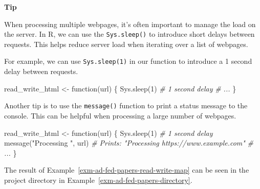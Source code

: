 \documentclass[
  letterpaper,
  DIV=11,
  numbers=noendperiod]{scrreport}
\newenvironment{Shaded}{\begin{snugshade}}{\end{snugshade}}
\newcommand{\CommentTok}[1]{\textcolor[rgb]{0.00,0.00,0.00}{\textit{#1}}}
\newcommand{\ControlFlowTok}[1]{\textcolor[rgb]{0.00,0.00,0.00}{#1}}
\newcommand{\DecValTok}[1]{\textcolor[rgb]{0.00,0.00,0.00}{#1}}
\newcommand{\FunctionTok}[1]{\textcolor[rgb]{0.00,0.00,0.00}{#1}}
\newcommand{\NormalTok}[1]{\textcolor[rgb]{0.00,0.00,0.00}{#1}}
\newcommand{\OtherTok}[1]{\textcolor[rgb]{0.00,0.00,0.00}{#1}}
\newcommand{\StringTok}[1]{\textcolor[rgb]{0.00,0.00,0.00}{#1}}
\theoremstyle{definition}
\theoremstyle{remark}
\begin{document}
\begin{tcolorbox}[enhanced jigsaw, breakable, arc=.35mm, leftrule=.75mm, rightrule=.15mm, colback=white, toprule=.15mm, bottomrule=.15mm, opacityback=0, left=2mm]

\textbf{ Tip}

When processing multiple webpages, it's often important to manage the
load on the server. In R, we can use the \texttt{Sys.sleep()} to
introduce short delays between requests. This helps reduce server load
when iterating over a list of webpages.

For example, we can use \texttt{Sys.sleep(1)} in our function to
introduce a 1 second delay between requests.

\begin{Shaded}
\begin{Highlighting}[]
\NormalTok{read\_write\_html }\OtherTok{\textless{}{-}} \ControlFlowTok{function}\NormalTok{(url) \{}
  \FunctionTok{Sys.sleep}\NormalTok{(}\DecValTok{1}\NormalTok{) }\CommentTok{\# 1 second delay}
  \CommentTok{\# ...}
\NormalTok{\}}
\end{Highlighting}
\end{Shaded}

Another tip is to use the \texttt{message()} function to print a status
message to the console. This can be helpful when processing a large
number of webpages.

\begin{Shaded}
\begin{Highlighting}[]
\NormalTok{read\_write\_html }\OtherTok{\textless{}{-}} \ControlFlowTok{function}\NormalTok{(url) \{}
  \FunctionTok{Sys.sleep}\NormalTok{(}\DecValTok{1}\NormalTok{) }\CommentTok{\# 1 second delay}
  \FunctionTok{message}\NormalTok{(}\StringTok{"Processing "}\NormalTok{, url) }\CommentTok{\# Prints: "Processing https://www.example.com"}
  \CommentTok{\# ...}
\NormalTok{\}}
\end{Highlighting}
\end{Shaded}

\end{tcolorbox}

The result of Example~\ref{exm-ad-fed-papers-read-write-map} can be seen
in the project directory in Example~\ref{exm-ad-fed-papers-directory}.
\end{document}
